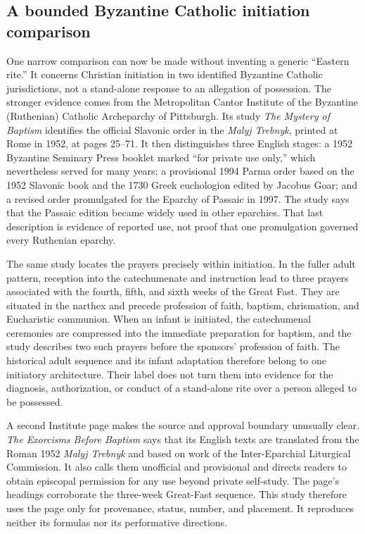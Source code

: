 \subsection{A bounded Byzantine Catholic initiation comparison}

One narrow comparison can now be made without inventing a generic ``Eastern
rite.'' It concerns Christian initiation in two identified Byzantine Catholic
jurisdictions, not a stand-alone response to an allegation of possession. The
stronger evidence comes from the Metropolitan Cantor Institute of the
Byzantine (Ruthenian) Catholic Archeparchy of Pittsburgh. Its study
\emph{The Mystery of Baptism} identifies the official Slavonic order in the
\emph{Malyj Trebnyk}, printed at Rome in 1952, at pages 25--71. It then
distinguishes three English stages: a 1952 Byzantine Seminary Press booklet
marked ``for private use only,'' which nevertheless served for many years; a
provisional 1994 Parma order based on the 1952 Slavonic book and the 1730
Greek euchologion edited by Jacobus Goar; and a revised order promulgated for
the Eparchy of Passaic in 1997. The study says that the Passaic edition became
widely used in other eparchies. That last description is evidence of reported
use, not proof that one promulgation governed every Ruthenian eparchy.

The same study locates the prayers precisely within initiation. In the fuller
adult pattern, reception into the catechumenate and instruction lead to three
prayers associated with the fourth, fifth, and sixth weeks of the Great Fast.
They are situated in the narthex and precede profession of faith, baptism,
chrismation, and Eucharistic communion. When an infant is initiated, the
catechumenal ceremonies are compressed into the immediate preparation for
baptism, and the study describes two such prayers before the sponsors'
profession of faith. The historical adult sequence and its infant adaptation
therefore belong to one initiatory architecture. Their label does not turn
them into evidence for the diagnosis, authorization, or conduct of a
stand-alone rite over a person alleged to be possessed.

A second Institute page makes the source and approval boundary unusually
clear. \emph{The Exorcisms Before Baptism} says that its English texts are
translated from the Roman 1952 \emph{Malyj Trebnyk} and based on work of the
Inter-Eparchial Liturgical Commission. It also calls them unofficial and
provisional and directs readers to obtain episcopal permission for any use
beyond private self-study. The page's headings corroborate the three-week
Great-Fast sequence. This study therefore uses the page only for provenance,
status, number, and placement. It reproduces neither its formulas nor its
performative directions.

